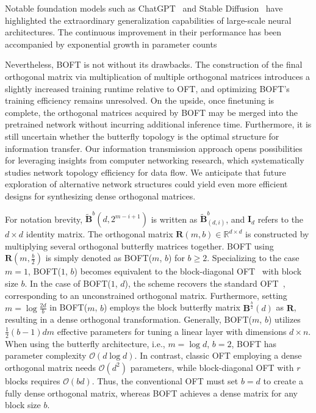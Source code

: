 Notable foundation models such as ChatGPT~\cite{brown2020language,chen2021evaluating} and Stable Diffusion~\cite{rombach2022high} have highlighted the extraordinary generalization capabilities of large-scale neural architectures. The continuous improvement in their performance has been accompanied by exponential growth in parameter counts

Nevertheless, BOFT is not without its drawbacks. The construction of the final orthogonal matrix via multiplication of multiple orthogonal matrices introduces a slightly increased training runtime relative to OFT, and optimizing BOFT’s training efficiency remains unresolved. On the upside, once finetuning is complete, the orthogonal matrices acquired by BOFT may be merged into the pretrained network without incurring additional inference time. Furthermore, it is still uncertain whether the butterfly topology is the optimal structure for information transfer. Our information transmission approach opens possibilities for leveraging insights from computer networking research, which systematically studies network topology efficiency for data flow. We anticipate that future exploration of alternative network structures could yield even more efficient designs for synthesizing dense orthogonal matrices.

For notation brevity, $\tilde{\bm{B}}^b(d, 2^{m-i+1})$ is written as $\tilde{\bm{B}}^b_{(d, i)}$, and $\bm{I}_d$ refers to the $d\times d$ identity matrix. The orthogonal matrix $\bm{R}(m, b)\in\mathbb{R}^{d\times d}$ is constructed by multiplying several orthogonal butterfly matrices together. BOFT using $\bm{R}(m, \frac{b}{2})$ is simply denoted as BOFT($m$, $b$) for $b\geq 2$. Specializing to the case $m=1$, BOFT($1$, $b$) becomes equivalent to the block-diagonal OFT~\cite{qiu2023controlling} with block size $b$. In the case of BOFT($1$, $d$), the scheme recovers the standard OFT~\cite{qiu2023controlling}, corresponding to an unconstrained orthogonal matrix. Furthermore, setting $m = \log \frac{2d}{b}$ in BOFT($m$, $b$) employs the block butterfly matrix $\bm{B}^{\frac{b}{2}}(d)$ as $\bm{R}$, resulting in a dense orthogonal transformation. Generally, BOFT($m$, $b$) utilizes $\frac{1}{2}(b-1)dm$ effective parameters for tuning a linear layer with dimensions $d\times n$. When using the butterfly architecture, i.e., $m = \log d$, $b = 2$, BOFT has parameter complexity $\mathcal{O}(d\log d)$. In contrast, classic OFT employing a dense orthogonal matrix needs $\mathcal{O}(d^2)$ parameters, while block-diagonal OFT with $r$ blocks requires $\mathcal{O}(bd)$. Thus, the conventional OFT must set $b = d$ to create a fully dense orthogonal matrix, whereas BOFT achieves a dense matrix for any block size $b$.

